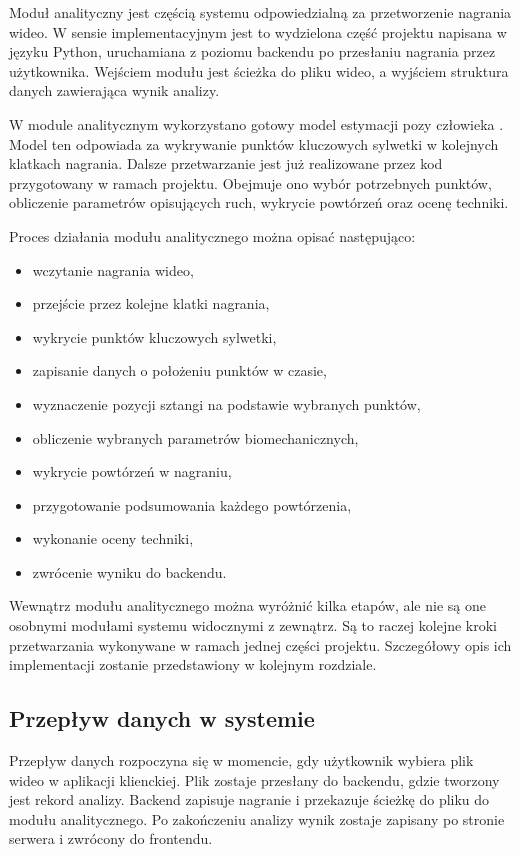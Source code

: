 Moduł analityczny jest częścią systemu odpowiedzialną za przetworzenie nagrania wideo. W sensie implementacyjnym jest to wydzielona część projektu napisana w języku Python, uruchamiana z poziomu backendu po przesłaniu nagrania przez użytkownika. Wejściem modułu jest ścieżka do pliku wideo, a wyjściem struktura danych zawierająca wynik analizy.

W module analitycznym wykorzystano gotowy model estymacji pozy człowieka \cite{mediapipe_pose_landmarker}. Model ten odpowiada za wykrywanie punktów kluczowych sylwetki w kolejnych klatkach nagrania. Dalsze przetwarzanie jest już realizowane przez kod przygotowany w ramach projektu. Obejmuje ono wybór potrzebnych punktów, obliczenie parametrów opisujących ruch, wykrycie powtórzeń oraz ocenę techniki.

Proces działania modułu analitycznego można opisać następująco:

\begin{itemize}
\item wczytanie nagrania wideo,
\item przejście przez kolejne klatki nagrania,
\item wykrycie punktów kluczowych sylwetki,
\item zapisanie danych o położeniu punktów w czasie,
\item wyznaczenie pozycji sztangi na podstawie wybranych punktów,
\item obliczenie wybranych parametrów biomechanicznych,
\item wykrycie powtórzeń w nagraniu,
\item przygotowanie podsumowania każdego powtórzenia,
\item wykonanie oceny techniki,
\item zwrócenie wyniku do backendu.
\end{itemize}

Wewnątrz modułu analitycznego można wyróżnić kilka etapów, ale nie są one osobnymi modułami systemu widocznymi z zewnątrz. Są to raczej kolejne kroki przetwarzania wykonywane w ramach jednej części projektu. Szczegółowy opis ich implementacji zostanie przedstawiony w kolejnym rozdziale.

\subsection{Przepływ danych w systemie}

Przepływ danych rozpoczyna się w momencie, gdy użytkownik wybiera plik wideo w aplikacji klienckiej. Plik zostaje przesłany do backendu, gdzie tworzony jest rekord analizy. Backend zapisuje nagranie i przekazuje ścieżkę do pliku do modułu analitycznego. Po zakończeniu analizy wynik zostaje zapisany po stronie serwera i zwrócony do frontendu.

